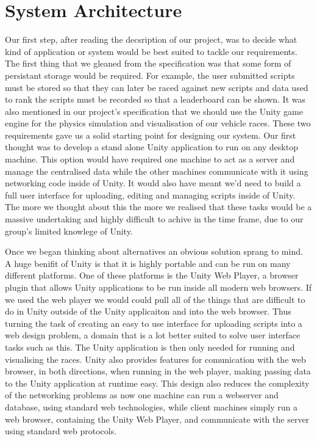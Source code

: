 \section{System Architecture}

Our first step, after reading the decsription of our project, was to decide what kind of application or system would be best suited to tackle our requirements. The first thing that we gleaned from the specification was that some form of persistant storage would be required. For example, the user submitted scripts must be stored so that they can later be raced against new scripts and data used to rank the scripts must be recorded so that a leaderboard can be shown. It was also mentioned in our project's specification that we should use the Unity game engine for the physics simulation and visualisation of our vehicle races. These two requirements gave us a solid starting point for designing our system. Our first thought was to develop a stand alone Unity application to run on any desktop machine. This option would have required one machine to act as a server and manage the centralised data while the other machines communicate with it using networking code inside of Unity. It would also have meant we'd need to build a full user interface for uploading, editing and managing scripts inside of Unity. The more we thought about this the more we realised that these tasks would be a massive undertaking and highly difficult to achive in the time frame, due to our group's limited knowlege of Unity.

Once we began thinking about alternatives an obvious solution sprang to mind. A huge benifit of Unity is that it is highly portable and can be run on many different platforms. One of these platforms is the Unity Web Player, a browser plugin that allows Unity applications to be run inside all modern web browsers. If we used the web player we would could pull all of the things that are difficult to do in Unity outside of the Unity applicaiton and into the web browser. Thus turning the task of creating an easy to use interface for uploading scripts into a web design problem, a domain that is a lot better suited to solve user interface tasks such as this. The Unity application is then only needed for running and visualising the races. Unity also provides features for comunication with the web browser, in both directions, when running in the web player, making passing data to the Unity application at runtime easy. This design also reduces the complexity of the networking problems as now one machine can run a webserver and database, using standard web technologies, while client machines simply run a web browser, containing the Unity Web Player, and communicate with the server using standard web protocols.

